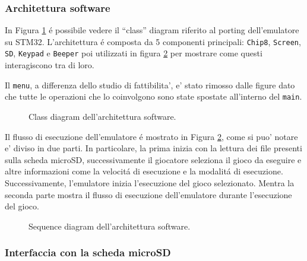 \documentclass[a4paper]{article}
\begin{document}
\subsubsection{Architettura software}

In Figura \ref{fig:class_diagram} é possibile vedere il ``class'' diagram riferito al porting dell'emulatore su STM32. L'architettura é composta da 5 componenti principali: \texttt{Chip8}, \texttt{Screen}, \texttt{SD}, \texttt{Keypad} e \texttt{Beeper} poi utilizzati in figura \ref{fig:sequence_diagram} per mostrare come questi interagiscono tra di loro.

Il \texttt{menu}, a differenza dello studio di fattibilita', e' stato rimosso dalle figure dato che tutte le operazioni che lo coinvolgono sono state spostate all'interno del \texttt{main}.

\begin{figure}[h!t]
    \begin{center}
        \begin{tikzpicture}[scale=0.6, transform shape]
            
        \end{tikzpicture}
    \end{center}
    \caption{
        Class diagram dell'architettura software.
    }
    \label{fig:class_diagram}
\end{figure}

Il flusso di esecuzione dell'emulatore é mostrato in Figura \ref{fig:sequence_diagram}, come si puo' notare e' diviso in due parti. In particolare, la prima inizia con la lettura dei file presenti sulla scheda microSD, successivamente il giocatore seleziona il gioco da eseguire e altre informazioni come la velocitá di esecuzione e la modalitá di esecuzione. Successivamente, l'emulatore inizia l'esecuzione del gioco selezionato. Mentra la seconda parte mostra il flusso di esecuzione dell'emulatore durante l'esecuzione del gioco.

\begin{figure}[h!t]
    \begin{center}
        
    \end{center}
    \caption{
        Sequence diagram dell'architettura software.
    }
    \label{fig:sequence_diagram}
\end{figure}

\subsubsection{Interfaccia con la scheda microSD}\label{subsubsec:sd}
\end{document}
